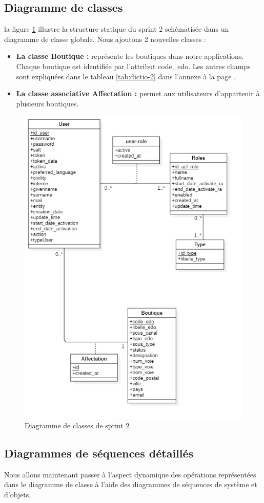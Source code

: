 \subsection{Diagramme de classes}
la figure \ref{fig:classdiag-sprint2} illustre la structure statique du sprint 2 schématisée dans un diagramme de classe globale.
Nous ajoutons 2 nouvelles classes :
\begin{itemize}
	\item \textbf{La classe Boutique :} représente les boutiques dans notre applications. Chaque boutique est identifiée par l'attribut code\_edo. Les autres champs sont expliquées dans le tableau \ref{tab:dictio-2} dans l'annexe à la page \pageref{tab:dictio-2}.
	\item \textbf{La classe associative Affectation : } permet aux utilisateurs d'appartenir à plusieurs boutiques.
\end{itemize}
\begin{figure}[H]
	\centering
	\includegraphics[width=0.5\linewidth]{img/conception/classes/ClassDiag-sprint2}
	\caption[Diagramme de classes de sprint 2]{Diagramme de classes de sprint 2}
	\label{fig:classdiag-sprint2}
\end{figure}

\subsection{Diagrammes de séquences détaillés}
Nous allons maintenant passer à l’aspect dynamique des opérations représentées dans le diagramme de classe à l’aide des diagrammes de séquences de système et d’objets.
